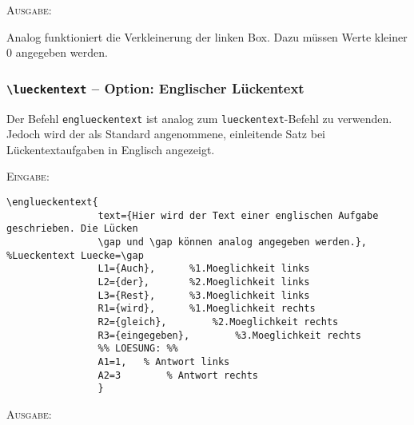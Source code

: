 \documentclass[a4paper,12pt]{article}
\begin{document}
\begin{minipage}{1.0\textwidth}
\textsc{Ausgabe:}



\end{minipage}

Analog funktioniert die Verkleinerung der linken Box. Dazu müssen Werte kleiner 0 angegeben
werden.

\subsubsection{\texttt{\textbackslash lueckentext} -- Option: Englischer Lückentext}
Der Befehl \texttt{englueckentext} ist analog zum \texttt{lueckentext}-Befehl zu verwenden. Jedoch wird der als Standard angenommene, einleitende Satz bei Lückentextaufgaben in Englisch angezeigt. 

\textsc{Eingabe:} 
\begin{verbatim}
\englueckentext{
				text={Hier wird der Text einer englischen Aufgabe geschrieben. Die Lücken 
				\gap und \gap können analog angegeben werden.}, 	%Lueckentext Luecke=\gap
				L1={Auch}, 		%1.Moeglichkeit links  
				L2={der}, 		%2.Moeglichkeit links
				L3={Rest}, 		%3.Moeglichkeit links
				R1={wird}, 		%1.Moeglichkeit rechts 
				R2={gleich}, 		%2.Moeglichkeit rechts
				R3={eingegeben}, 		%3.Moeglichkeit rechts
				%% LOESUNG: %%
				A1=1,   % Antwort links
				A2=3		% Antwort rechts 
				}
\end{verbatim}

\textsc{Ausgabe:}
\end{document}
